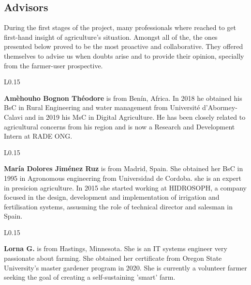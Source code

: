 \subsection{Advisors}\label{adv}
During the first stages of the project, many professionals where reached to get first-hand insight of agriculture's situation. Amongst all of the, the ones presented below proved to be the most proactive and collaborative. They offered themselves to  advise us when doubts arise and to provide their opinion, specially from the farmer-user prospective.\\

\begin{wrapfigure}{L}{0.15\textwidth}
    \end{wrapfigure}
\textbf{Amèhouho Bognon Théodore} is from Benín, Africa. In 2018 he obtained his BsC in Rural Engineering and water management from Université d'Abormey-Calavi and in 2019 his MsC in Digital Agriculture. He has been closely related to agricultural concerns from his region and is now a Research and Development Intern at RADE ONG.\\
%
\newpage
%
\begin{wrapfigure}{L}{0.15\textwidth}
    \end{wrapfigure}
\textbf{María Dolores Jiménez Ruz} is from Madrid, Spain. She obtained her BsC in 1995 in Agronomous engineering from Universidad de Cordoba. she is an expert in presicion agriculture. In 2015 she started working at HIDROSOPH, a company focused in the design, development and implementation of irrigation and fertilisation systems, assusming the role of technical director and salesman in Spain.\\

\begin{wrapfigure}{L}{0.15\textwidth}
    \end{wrapfigure}
\textbf{Lorna G.} is from Hastings, Minnesota. She is an IT systems engineer very passionate about farming. She obtained her certificate from  Oregon State University's master gardener program  in 2020. She is currently a volunteer farmer seeking the goal of creating a self-sustaining 'smart' farm. \\
